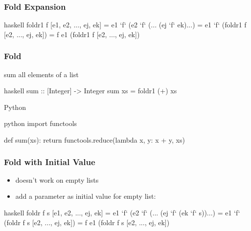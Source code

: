 \documentclass[dvipsnames]{beamer}
\theoremstyle{plain}
\begin{document}
\begin{frame}[fragile]
  \frametitle{Fold Expansion}

  \begin{block}{}
    \begin{pygments}{haskell}
foldr1 f [e1, e2, ..., ej, ek]
    = e1 `f` (e2 `f` (... (ej `f` ek)...)
    = e1 `f` (foldr1 f [e2, ..., ej, ek])
    = f e1 (foldr1 f [e2, ..., ej, ek])
    \end{pygments}
  \end{block}
\end{frame}

\begin{frame}[fragile]
  \frametitle{Fold}

  \begin{exampleblock}{sum all elements of a list}
    \begin{pygments}{haskell}
sum :: [Integer] -> Integer
sum xs = foldr1 (+) xs
    \end{pygments}
  \end{exampleblock}

  \bigskip
  \begin{exampleblock}{Python}
    \begin{pygments}{python}
import functools

def sum(xs):
  return functools.reduce(lambda x, y: x + y, xs)
    \end{pygments}
  \end{exampleblock}
\end{frame}

\begin{frame}[fragile]
  \frametitle{Fold with Initial Value}

  \begin{itemize}
    \item {} doesn't work on empty lists
    \item add a parameter as initial value for empty list:
  \end{itemize}

  \begin{block}{}
    \begin{pygments}{haskell}
foldr f s [e1, e2, ..., ej, ek]
    = e1 `f` (e2 `f` (... (ej `f` (ek `f` s))...)
    = e1 `f` (foldr f s [e2, ..., ej, ek])
    = f e1 (foldr f s [e2, ..., ej, ek])
    \end{pygments}
  \end{block}
\end{frame}
\end{document}
